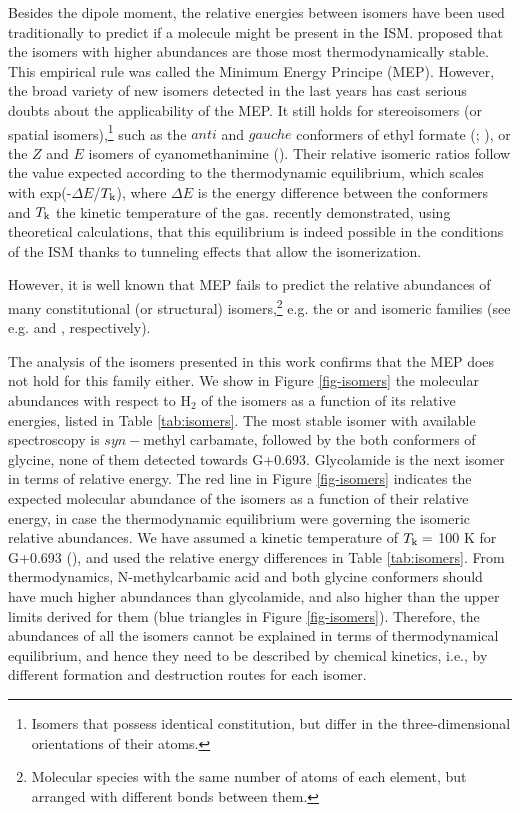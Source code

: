 \documentclass[twocolumn]{aastex63}
\begin{document}
Besides the dipole moment, the relative energies between isomers have been used  traditionally to predict if a molecule might be present in the ISM.
\citet{lattelais2011} proposed that the isomers with higher abundances are those most thermodynamically stable. This empirical rule was called the Minimum Energy Principe (MEP).
However, the broad variety of new isomers detected in the last years has cast serious doubts about the applicability of the MEP. 
It still holds for stereoisomers (or spatial isomers),\footnote{Isomers that possess identical constitution, but differ in the three-dimensional 
orientations of their atoms.} such as the $anti$ and $gauche$ conformers of ethyl formate (; \citealt{tercero_discovery_2013,rivilla_chemical_2017}), or the $Z$ and $E$ isomers of cyanomethanimine ().
Their relative isomeric ratios follow the value expected according to the thermodynamic equilibrium, which scales with exp(-$\Delta E$/$T_{\rm k}$), where $\Delta E$ is the energy difference between the conformers and $T_{\rm k}$ the kinetic temperature of the gas. \citet{garciadelaconcepcion2021} recently demonstrated, using theoretical calculations, that this equilibrium is indeed possible in the conditions of the ISM thanks to tunneling effects that allow the isomerization.
  
However, it is well known that MEP fails to predict the relative abundances of many constitutional (or structural) isomers,\footnote{Molecular species with the same number of atoms of each element, but arranged with different bonds between them.} e.g. the  or  and isomeric families (see e.g. \citealt{shingledecker2019} and \citealt{mininni2020}, respectively).

The analysis of the  isomers presented in this work confirms that the MEP does not hold for this family either. 
We show in Figure \ref{fig-isomers} the molecular abundances with respect to H$_{2}$ of the 
 isomers as a function of its relative energies, listed in  Table \ref{tab:isomers}.
The most stable isomer with available spectroscopy is $syn-$methyl carbamate, followed by the both conformers of glycine, none of them detected towards G+0.693.  
Glycolamide is the next isomer in terms of relative energy. The red line in Figure \ref{fig-isomers} indicates the expected molecular abundance of the  isomers as a function of their relative energy, in case the thermodynamic equilibrium were governing the isomeric relative abundances. We have assumed a kinetic temperature of $T_{\rm k} =$ 100 K for G+0.693 (\citealt{zeng2018}), and used the relative energy differences in Table \ref{tab:isomers}. From thermodynamics, N-methylcarbamic acid and both glycine conformers should have much higher abundances than glycolamide, and also higher than the upper limits derived for them (blue triangles in Figure \ref{fig-isomers}). Therefore, the abundances of all the  isomers cannot be explained in terms of thermodynamical equilibrium, and hence they need to be described by chemical kinetics, i.e., by different formation and destruction routes for each isomer. 
\end{document}
